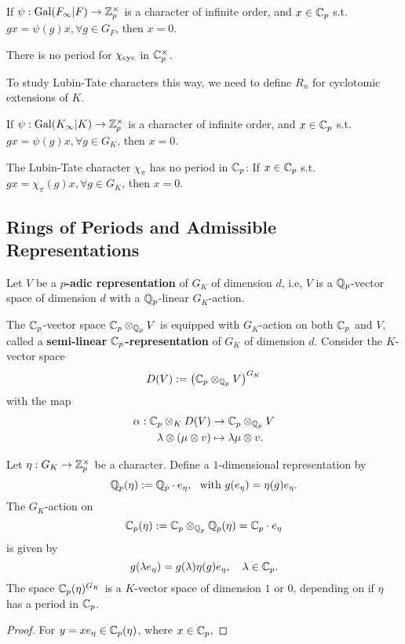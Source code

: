 \begin{theorem}
    If $\psi : \operatorname{Gal}(F_\infty|F)\to\mathbb{Z}_p^\times$
    is a character of infinite order,
    and $x\in\mathbb{C}_p$ s.t. $gx = \psi(g)x, \forall g\in G_F$, then $x = 0$.
\end{theorem}

\begin{corollary}
    There is no period for $\chi_{\mathrm{cyc}}$ in $\mathbb{C}_p^\times$.
\end{corollary}

To study Lubin-Tate characters this way, we need to define $R_n$ for cyclotomic extensions of $K$.

\begin{corollary}
    If $\psi : \operatorname{Gal}(K_\infty|K)\to\mathbb{Z}_p^\times$
    is a character of infinite order,
    and $x\in\mathbb{C}_p$ s.t. $gx = \psi(g)x, \forall g\in G_K$, then $x = 0$.
\end{corollary}

\begin{corollary}
    The Lubin-Tate character $\chi_\pi$ has no period in $\mathbb{C}_p$:
    If $x\in\mathbb{C}_p$ s.t. $gx = \chi_\pi(g)x, \forall g\in G_K$, then $x = 0$.
\end{corollary}


\subsection{Rings of Periods and Admissible Representations}

Let $V$ be a \textbf{$p$-adic representation} of $G_K$ of dimension $d$, i.e, $V$ is a $\mathbb{Q}_p$-vector space of dimension $d$ with a $\mathbb{Q}_p$-linear $G_K$-action.

The $\mathbb{C}_p$-vector space $\mathbb{C}_p\otimes_{\mathbb{Q}_p} V$ is equipped with $G_K$-action on both $\mathbb{C}_p$ and $V$,
called a \textbf{semi-linear $\mathbb{C}_p$-representation} of $G_K$ of dimension $d$.
Consider the $K$-vector space \[D(V) := \left( \mathbb{C}_p\otimes_{\mathbb{Q}_p} V  \right)^{G_K}\]
with the map \begin{align*}
    \alpha : \mathbb{C}_p\otimes_{K} D(V)&\to \mathbb{C}_p\otimes_{\mathbb{Q}_p} V\\
    \lambda\otimes(\mu\otimes v)&\mapsto \lambda\mu\otimes v.
\end{align*}


\begin{example}
Let $\eta : G_K\to\mathbb{Z}_p^\times$ be a character.
Define a $1$-dimensional representation by\[\mathbb{Q}_p(\eta) := \mathbb{Q}_p\cdot e_\eta,\ \text{ with } g(e_\eta) = \eta(g)e_\eta.\]
The $G_K$-action on \[\mathbb{C}_p(\eta) := \mathbb{C}_p\otimes_{\mathbb{Q}_p} \mathbb{Q}_p(\eta) = \mathbb{C}_p\cdot e_\eta\]
is given by \[g(\lambda e_\eta) = g(\lambda) \eta(g)e_\eta,\quad \lambda\in\mathbb{C}_p.\]
The space $\mathbb{C}_p(\eta)^{G_K}$ is a $K$-vector space of dimension $1$ or $0$, depending on if $\eta$ has a period in $\mathbb{C}_p$.

\begin{proof}
    For $y = xe_\eta\in\mathbb{C}_p(\eta)$, where $x\in\mathbb{C}_p$,
\end{proof}
\end{example}

